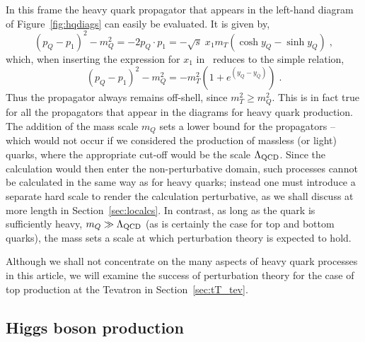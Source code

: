 \documentclass[12pt]{iopart}
\def\beq{\begin{equation}}
\def\eeq{\end{equation}}
\begin{document}
In this frame the heavy quark propagator that appears in the left-hand diagram
of Figure~\ref{fig:hqdiags} can easily be evaluated. It is given by,
\beq
(p_Q - p_1)^2 - m_Q^2 = -2 p_Q \cdot p_1 = - \sqrt{s} \; x_1 m_T (\cosh y_Q - \sinh y_Q) \; ,
\eeq
which, when inserting the expression for $x_1$ in~ reduces to the simple relation,
\beq
(p_Q - p_1)^2 - m_Q^2 = -m_T^2 \left( 1 + e^{(y_Q-y_{\bar Q})} \right) \; .
\eeq 
Thus the propagator always remains off-shell, since $m_T^2 \geq m_Q^2$. This is in fact true for all the propagators
that appear in the diagrams for heavy quark production. The addition of the mass scale $m_Q$ sets a lower bound for the
propagators -- which would not occur if we considered the production of massless (or light) quarks, where the
appropriate cut-off would be the scale $\Lambda_{\rm QCD}$. Since the calculation would then enter the non-perturbative domain,
such processes cannot be calculated in the same way as for heavy quarks;
instead one must introduce a separate hard scale to render the calculation
perturbative, as we shall discuss at more length in Section~\ref{sec:localcs}. In contrast, as long as the quark
is sufficiently heavy, $m_Q \gg \Lambda_{\rm QCD}$ (as is certainly the case for top and bottom quarks), the mass sets a scale at which
perturbation theory is expected to hold.

Although we shall not concentrate on the many aspects of heavy quark processes in this article, we will
examine the success of perturbation theory for the case of top production at the Tevatron in Section~\ref{sec:tT_tev}.

\subsection{Higgs boson production}
\label{sec:higgs}
\end{document}

